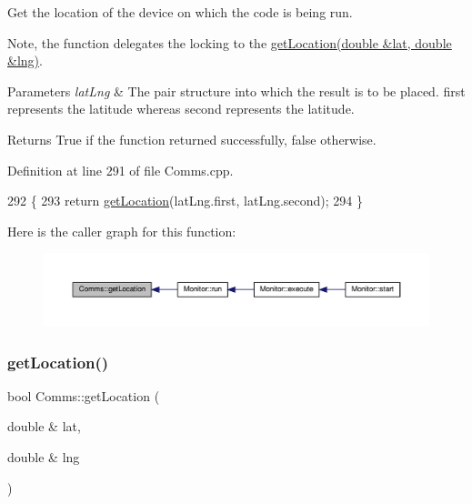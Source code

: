 Get the location of the device on which the code is being run.

Note, the function delegates the locking to the \hyperlink{class_comms_a083b399b3115711b1e2d55f800cac58c}{get\+Location(double \&lat, double \&lng)}.


\begin{DoxyParams}{Parameters}
{\em lat\+Lng} & The pair structure into which the result is to be placed. \textquotesingle{}first\textquotesingle{} represents the latitude whereas \textquotesingle{}second\textquotesingle{} represents the latitude. \\
\hline
\end{DoxyParams}
\begin{DoxyReturn}{Returns}
True if the function returned successfully, false otherwise. 
\end{DoxyReturn}


Definition at line 291 of file Comms.\+cpp.


\begin{DoxyCode}
292 \{
293     \textcolor{keywordflow}{return} \hyperlink{class_comms_a26030245503e82aa6278e39cd0886c31}{getLocation}(latLng.first, latLng.second);
294 \}
\end{DoxyCode}
Here is the caller graph for this function\+:\nopagebreak
\begin{figure}[H]
\begin{center}
\leavevmode
\includegraphics[width=350pt]{d8/dcc/class_comms_a26030245503e82aa6278e39cd0886c31_icgraph}
\end{center}
\end{figure}
\mbox{\label{class_comms_a083b399b3115711b1e2d55f800cac58c}} 
\subsubsection{\texorpdfstring{get\+Location()}{getLocation()}\hspace{0.1cm}{\footnotesize\ttfamily [2/2]}}
{\footnotesize\ttfamily bool Comms\+::get\+Location (\begin{DoxyParamCaption}\item[{double \&}]{lat,  }\item[{double \&}]{lng }\end{DoxyParamCaption})}

